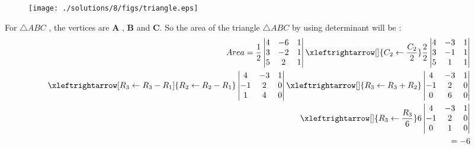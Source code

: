 \begin{figure}[!ht]
\centering
\texttt{[image: ./solutions/8/figs/triangle.eps]}
\caption{}
\label{fig:tri_geo_8_tri_sss_py}
\end{figure}
For  $ \triangle ABC $ , the vertices are \textbf{A} , \textbf{B} and \textbf{C}.
So the area of the triangle $ \triangle ABC $  by using determinant will be :
\begin{equation}
\begin{aligned}
    Area = \frac{1}{2}\begin{vmatrix}
      4       & -6    & 1 \\ 
      3       & -2    & 1 \\
      5       & 2     & 1 \\
      
    \end{vmatrix} \xleftrightarrow[]{C_2\leftarrow \frac{C_2}{2}} \frac{2}{2}\begin{vmatrix}
      4       &-3    & 1 \\ 
      3       &-1    & 1 \\
      5       & 1    & 1 \\
      
    \end{vmatrix}\\
    \xleftrightarrow[R_3 \leftarrow R_3-R_1]{R_2\leftarrow R_2-R_1}
    \begin{vmatrix}
      4       & -3    & 1 \\ 
      -1       & 2    & 0 \\
      1       & 4   & 0 \\
      
    \end{vmatrix}  \xleftrightarrow[]{R_3\leftarrow R_3+R_2}
    \begin{vmatrix}
      4       & -3    & 1 \\ 
      -1       & 2    & 0 \\
      0       & 6   & 0 \\
      
    \end{vmatrix} \\ \xleftrightarrow[]{R_3\leftarrow \frac{R_3}{6}}
    6 \begin{vmatrix}
      4       & -3    & 1 \\ 
      -1       & 2    & 0 \\
      0       & 1   & 0 \\
      
    \end{vmatrix} \\
    =-6
   \end{aligned}
  \end{equation}
